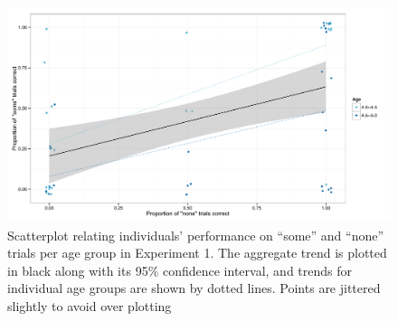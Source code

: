\documentclass[man]{apa2}
\begin{document}
 \begin{figure}[!h]
 	\centering
           \begin{floatrow}
           \end{floatrow}
\end{figure}	


\begin{figure} 
 \begin{center} 
  \includegraphics[height=2.5in]{figures/exp1_diffs.pdf} 
  \caption{\label{fig:exp1_diffs} Scatterplot relating individuals' performance on ``some'' and ``none'' trials per age group in Experiment 1. The aggregate trend is plotted in black along with its 95\% confidence interval, and trends for individual age groups are shown by dotted lines. Points are jittered slightly to avoid over plotting} 
 \end{center} 
\end{figure}
\end{document}
